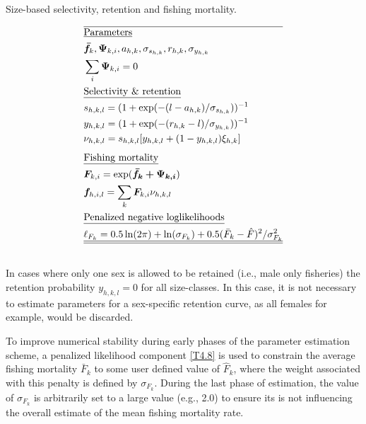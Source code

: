 \documentclass[12pt,letterpaper]{article}
\newcounter{saveEq}
\def\putEq{\setcounter{saveEq}{\value{equation}}}
\def\getEq{\setcounter{equation}{\value{saveEq}}}
\def\tableEq{ %
    \putEq \setcounter{equation}{0}
    \renewcommand{\theequation}{T\arabic{table}.\arabic{equation}}
    \vspace{-5mm}
    }
\def\normalEq{ %
    \getEq
    \renewcommand{\theequation}{\arabic{section}.\arabic{equation}}}
\begin{document}
    \begin{table}
      \centering
      \caption{Size-based selectivity, retention and fishing mortality.}
      \label{tab:fishing_mortality}
      \tableEq
      \begin{align}
      \hline \nonumber
      &\mbox{\underline{Parameters}} \nonumber \\
      & \bm{\bar{f}}_k,\bm{\Psi}_{k,i}, a_{h,k},\sigma_{s_{h,k}},r_{h,k},\sigma_{y_{h,k}} \label{T4.1}\\
      & \sum_i \bm\Psi_{k,i} = 0 \label{T4.2}\\
      &\mbox{\underline{Selectivity \& retention}} \nonumber \\
      &s_{h,k,l} = (1 + \exp(-(l-a_{h,k} )/ \sigma_{s_{h,k}}))^{-1}\label{T4.3}\\
      &y_{h,k,l} = (1 + \exp(-(r_{h,k} - l) / \sigma_{y_{h,k}}))^{-1}\label{T4.4}\\
      &\nu_{h,k,l}  = s_{h,k,l} [y_{h,k,l} + (1-y_{h,k,l})\xi_{h,k}]\label{T4.5}\\[1ex]
      &\mbox{\underline{Fishing mortality}} \nonumber \\
      & \bm{F}_{k,i} = \exp(\bm{\bar{f}_k + \bm{\Psi_{k,i}}}) \label{T4.6}\\
      &\bm{f}_{h,i,l} = \sum_k \bm{F}_{k,i} \nu_{h,k,l} \label{T4.7}\\
      &\mbox{\underline{Penalized negative loglikelihoods}} \nonumber\\
      &\ell_{F_k} = 0.5 \ln(2 \pi) + \ln(\sigma_{F_k}) 
      + 0.5 (\bar{F}_k - \hat{F})^2 / \sigma_{F_k}^2 \label{T4.8}\\
      \hline \hline \nonumber
      \end{align}
      \normalEq
    \end{table}
    In cases where only one sex is allowed to be retained (i.e., male only fisheries) the retention probability $y_{h,k,l} = 0$ for all size-classes.  In this case, it is not necessary to estimate parameters for a sex-specific retention curve, as all females for example, would be discarded.

    To improve numerical stability during early phases of the parameter estimation scheme, a penalized likelihood component \eqref{T4.8} is used to constrain the average fishing mortality $\bar{F}_k$ to some user defined value of $\hat{F}_k$, where the weight associated with this penalty is defined by $\sigma_{F_k}$.  During the last phase of estimation, the value of $\sigma_{F_k}$ is arbitrarily set to a large value (e.g., 2.0) to ensure its is not influencing the overall estimate of the mean fishing mortality rate.
\end{document}
